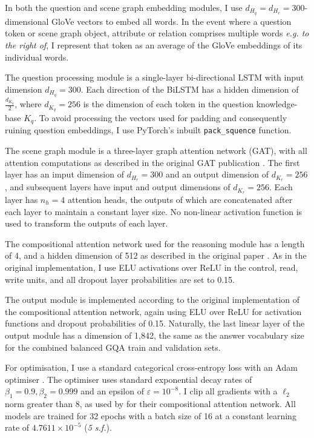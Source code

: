 In both the question and scene graph embedding modules, I use \(d_{H_q} = d_{H_r} = 300\)-dimensional GloVe vectors \cite{pennington2014glove} to embed all words. In the event where a question token or scene graph object, attribute or relation comprises multiple words \textit{e.g. to the right of}, I represent that token as an average of the GloVe embeddings of its individual words.

The question processing module is a single-layer bi-directional LSTM \cite{hochreiter1997long} with input dimension \(d_{H_q} = 300\). Each direction of the BiLSTM has a hidden dimension of \(\frac{d_{K_q}}{2}\), where \(d_{K_q} = 256\) is the dimension of each token in the question knowledge-base \(K_q\). To avoid processing the vectors used for padding and consequently ruining question embeddings, I use PyTorch's inbuilt \texttt{pack\_squence} function. \cite{paszke2019pytorch}

The scene graph module is a three-layer graph attention network (GAT), with all attention computations as described in the original GAT publication \cite{velivckovic2017graph}. The first layer has an imput dimension of \(d_{H_r} = 300\) and an output dimension of \(d_{K_r} = 256\), and subsequent layers have input and output dimensions of \(d_{K_r} = 256\). Each layer has \(n_h = 4\) attention heads, the outputs of which are concatenated after each layer to maintain a constant layer size. No non-linear activation function is used to transform the outputs of each layer.

The compositional attention network used for the reasoning module has a length of 4, and a hidden dimension of 512 as described in the original paper \cite{hudson2018compositional}. As in the original implementation, I use ELU activations over ReLU in the control, read, write units, and all dropout layer probabilities are set to 0.15.

The output module is implemented according to the original implementation of the compositional attention network, again using ELU over ReLU for activation functions and dropout probabilities of 0.15. Naturally, the last linear layer of the output module has a dimension of 1,842, the same as the answer vocabulary size for the combined balanced GQA train and validation sets.

For optimisation, I use a standard categorical cross-entropy loss with an Adam optimiser \cite{kingma2014adam}. The optimiser uses standard exponential decay rates of \(\beta_1 = 0.9, \beta_2 = 0.999\) and an epsilon of \(\varepsilon = 10^{-8}\). I clip all gradients with a \(\ell_2\) norm greater than 8, as used by \citeauthor{hudson2018compositional} for their compositional attention network. All models are trained for 32 epochs with a batch size of 16 at a constant learning rate of \(4.7611 \times 10^{-5}\) (\textit{5 s.f.}).
